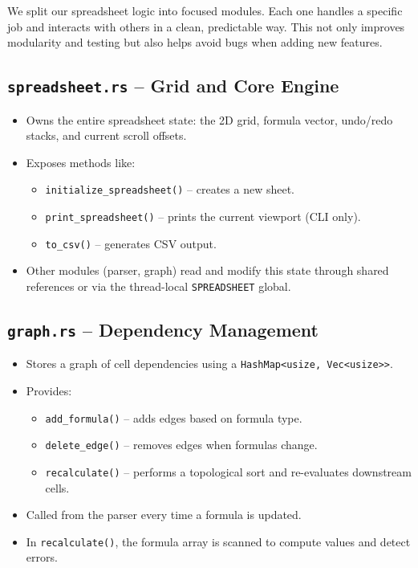 \documentclass[12pt]{article}
\begin{document}
    We split our spreadsheet logic into focused modules. Each one handles a specific job and interacts with others in a clean, predictable way. This not only improves modularity and testing but also helps avoid bugs when adding new features.

    \subsection{\texttt{spreadsheet.rs} – Grid and Core Engine}
    \begin{itemize}
        \item Owns the entire spreadsheet state: the 2D grid, formula vector, undo/redo stacks, and current scroll offsets.
        \item Exposes methods like:
        \begin{itemize}
            \item \texttt{initialize\_spreadsheet()} – creates a new sheet.
            \item \texttt{print\_spreadsheet()} – prints the current viewport (CLI only).
            \item \texttt{to\_csv()} – generates CSV output.
        \end{itemize}
        \item Other modules (parser, graph) read and modify this state through shared references or via the thread-local \texttt{SPREADSHEET} global.
    \end{itemize}

    \subsection{\texttt{graph.rs} – Dependency Management}
    \begin{itemize}
        \item Stores a graph of cell dependencies using a \texttt{HashMap<usize, Vec<usize>>}.
        \item Provides:
        \begin{itemize}
            \item \texttt{add\_formula()} – adds edges based on formula type.
            \item \texttt{delete\_edge()} – removes edges when formulas change.
            \item \texttt{recalculate()} – performs a topological sort and re-evaluates downstream cells.
        \end{itemize}
        \item Called from the parser every time a formula is updated.
        \item In \texttt{recalculate()}, the formula array is scanned to compute values and detect errors.
    \end{itemize}
\end{document}
